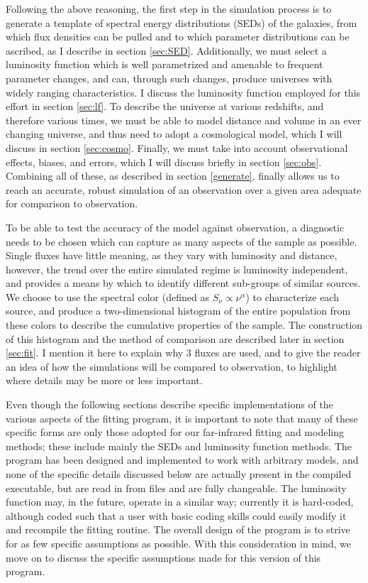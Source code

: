 \documentclass[twocolumn,letterpaper,10pt]{article}
\begin{document}
Following the above reasoning, the first step in the simulation process is to generate a template of spectral energy distributions (SEDs) of the galaxies, from which flux densities can be pulled and to which parameter distributions can be ascribed, as I describe in section \ref{sec:SED}. Additionally, we must select a luminosity function which is well parametrized and amenable to frequent parameter changes, and can, through such changes, produce universes with widely ranging characteristics. I discuss the luminosity function employed for this effort in section \ref{sec:lf}. To describe the universe at various redshifts, and therefore various times, we must be able to model distance and volume in an ever changing universe, and thus need to adopt a cosmological model, which I will discuss in section \ref{sec:cosmo}. Finally, we must take into account observational effects, biases, and errors, which I will discuss briefly in section \ref{sec:obs}. Combining all of these, as described in section \ref{generate}, finally allows us to reach an accurate, robust simulation of an observation over a given area adequate for comparison to observation.

To be able to test the accuracy of the model against observation, a diagnostic needs to be chosen which can capture as many aspects of the sample as possible. Single fluxes have little meaning, as they vary with luminosity and distance, however, the trend over the entire simulated regime is luminosity independent, and provides a means by which to identify different sub-groups of similar sources. We choose to use the spectral color (defined as $S_\nu\propto\nu^\alpha$) to characterize each source, and produce a two-dimensional histogram of the entire population from these colors to describe the cumulative properties of the sample. The construction of this histogram and the method of comparison are described later in section \ref{sec:fit}. I mention it here to explain why 3 fluxes are used, and to give the reader an idea of how the simulations will be compared to observation, to highlight where details may be more or less important.

Even though the following sections describe specific implementations of the various aspects of the fitting program, it is important to note that many of these specific forms are only those adopted for our far-infrared fitting and modeling methods; these include mainly the SEDs and luminosity function methods. The program has been designed and implemented to work with arbitrary models, and none of the specific details discussed below are actually present in the compiled executable, but are read in from files and are fully changeable. The luminosity function may, in the future, operate in a similar way; currently it is hard-coded, although coded such that a user with basic coding skills could easily modify it and recompile the fitting routine. The overall design of the program is to strive for as few specific assumptions as possible. With this consideration in mind, we move on to discuss the specific assumptions made for this version of this program.
\end{document}
